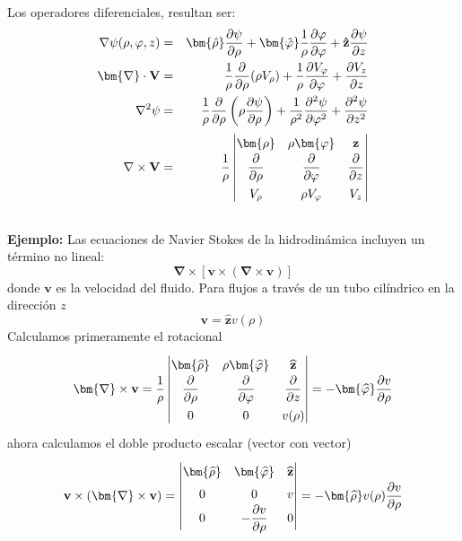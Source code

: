 Los operadores diferenciales, resultan ser:
\begin{eqnarray}
\nabla \psi (\rho, \varphi, z) &=& \bm{\hat{\rho}} \dfrac{\partial \psi}{\partial \rho} + \bm{\hat{\varphi}} \dfrac{1}{\rho} \dfrac{\partial \varphi}{\partial \varphi} + \mathbf{\hat{z}} \dfrac{\partial \psi}{\partial z} \\
\bm{\nabla} \cdot \mathbf{V} &=& \dfrac{1}{\rho} \dfrac{\partial}{\partial \rho} (\rho V_{\rho}) + \dfrac{1}{\rho} \dfrac{\partial V_{\varphi}}{\partial \varphi} + \dfrac{\partial V_{z}}{\partial z} \\
\nabla^{2} \psi &=& \dfrac{1}{\rho} \dfrac{\partial}{\partial \rho} \left( \rho \dfrac{\partial \psi}{\partial \rho} \right) + \dfrac{1}{\rho^{2}} \dfrac{\partial^{2} \psi}{\partial \varphi^{2}} + \dfrac{\partial^{2} \psi}{\partial z^{2}} \\
\mathbf{\nabla} \times \mathbf{V} &=& \dfrac{1}{\rho} 
\renewcommand\arraystretch{1.5} \begin{vmatrix}
\bm{\rho} & \rho \bm{\varphi} & \mathbf{z} \\
\dfrac{\partial}{\partial \rho} & \dfrac{\partial}{\partial \varphi} & \dfrac{\partial}{\partial z} \\
V_{\rho} & \rho V_{\varphi} & V_{z}
\end{vmatrix}
\end{eqnarray}
\\
\textbf{Ejemplo: } Las ecuaciones de Navier Stokes de la hidrodinámica incluyen un término no lineal:
\[ \bm{\nabla} \times [ \mathbf{v} \times ( \bm{\nabla} \times \mathbf{v})] \]
donde $\mathbf{v}$ es la velocidad del fluido. Para flujos a través de un tubo cilíndrico en la dirección $z$
\[ \mathbf{v} =  \mathbf{\widehat{z}} v (\rho) \]
Calculamos primeramente el rotacional
\[ \bm{\nabla} \times \mathbf{v} = \dfrac{1}{\rho} \left| 
\renewcommand\arraystretch{1.5} \begin{matrix}
\bm{\widehat{\rho}} & \rho \bm{\widehat{\varphi}} & \mathbf{\widehat{z}} \\
\dfrac{\partial}{\partial \rho} & \dfrac{\partial}{\partial \varphi} & \dfrac{\partial}{\partial z} \\
0 & 0 & v(\rho)\end{matrix} \right| = - \bm{\widehat{\varphi}} \dfrac{\partial v}{\partial \rho} \]
ahora calculamos el doble producto escalar (vector con vector)
\[ \mathbf{v} \times (\bm{\nabla} \times \mathbf{v}) = \left| 
\renewcommand\arraystretch{1.5} \begin{matrix}
\bm{\widehat{\rho}} & \bm{\widehat{\varphi}} & \mathbf{\widehat{z}} \\
0 & 0 & v \\
0 & - \dfrac{\partial v}{\partial \rho} & 0\end{matrix} \right| = - \bm{\widehat{\rho}} v(\rho) \dfrac{\partial v}{\partial \rho} \] 

